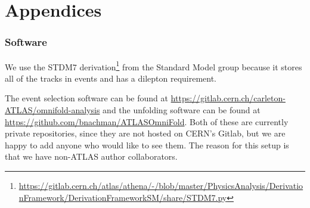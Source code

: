 \documentclass[NOTE, atlasdraft=true, texlive=2016, UKenglish]{\ATLASLATEXPATH atlasdoc}
\begin{document}
\clearpage
\appendix
\part*{Appendices}

\section{Software}

We use the STDM7 derivation\footnote{\url{https://gitlab.cern.ch/atlas/athena/-/blob/master/PhysicsAnalysis/DerivationFramework/DerivationFrameworkSM/share/STDM7.py}} from the Standard Model group because it stores all of the tracks in events and has a dilepton requirement.

The event selection software can be found at \url{https://gitlab.cern.ch/carleton-ATLAS/omnifold-analysis} and the unfolding software can be found at \url{https://github.com/bnachman/ATLASOmniFold}.  Both of these are currently private repositories, since they are not hosted on CERN's Gitlab, but we are happy to add anyone who would like to see them.  The reason for this setup is that we have non-ATLAS author collaborators.


\clearpage


\clearpage


\clearpage


\clearpage


\clearpage


\clearpage




\end{document}
